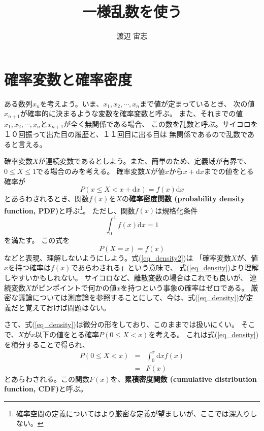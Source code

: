 \documentclass{jarticle}
\title{一様乱数を使う}
\author{渡辺 宙志}
\affiliation{慶応義塾大学理工学部物理情報工学科}
\newcommand{\diff}{{\mathrm d}}
\begin{document}
\maketitle

\section{確率変数と確率密度}

ある数列$x_n$を考えよう。いま、$x_1, x_2, \cdots, x_n$まで値が定まっているとき、
次の値$x_{n+1}$が確率的に決まるような変数を確率変数と呼ぶ。
また、それまでの値$x_1, x_2, \cdots, x_n$と$x_{n+1}$が全く無関係である場合、
この数を乱数と呼ぶ。サイコロを１０回振って出た目の履歴と、１１回目に出る目は
無関係であるので乱数であると言える。

確率変数$X$が連続変数であるとしよう。また、簡単のため、定義域が有界で、$0 \le X \le 1$でる場合のみを考える。
確率変数$X$が値$x$から$x+\diff x$までの値をとる確率が
\begin{equation}
P(x \le X < x +\diff x) = f(x) \diff x \label{eq_density}
\end{equation}
とあらわされるとき、関数$f(x)$を$X$の{\bf 確率密度関数 (probability density function, PDF)}と呼ぶ\footnote{確率空間の定義についてはより厳密な定義が望ましいが、ここでは深入りしない。}。
ただし、関数$f(x)$は規格化条件
\begin{equation}
\int_0^1 f(x) \diff x  = 1 
\end{equation}
を満たす。
この式を
\begin{equation} \label{eq_density2}
P(X = x) = f(x)
\end{equation}
などと表現、理解しないようにしよう。式(\ref{eq_density2})は
「確率変数$X$が、値$x$を持つ確率は$f(x)$であらわされる」という意味で、
式(\ref{eq_density})より理解しやすいかもしれない。
サイコロなど、離散変数の場合はこれでも良いが、
連続変数$X$がピンポイントで何かの値$x$を持つという事象の確率はゼロである。
厳密な議論については測度論を参照することにして、今は、式(\ref{eq_density})が定義だと覚えておけば問題はない。

さて、式(\ref{eq_density})は微分の形をしており、このままでは扱いにくい。
そこで、$X$が$x$以下の値をとる確率$P(0\le X < x)$を考える。
これは式(\ref{eq_density})を積分することで得られ、
\begin{eqnarray}
P(0\le X < x) &=& \int_0^x \diff x f(x)\\
&=& F(x) \label{eq_cdf}
\end{eqnarray}
とあらわされる。この関数$F(x)$を、{\bf 累積密度関数 (cumulative 
distribution function, CDF)}と呼ぶ。
\end{document}
